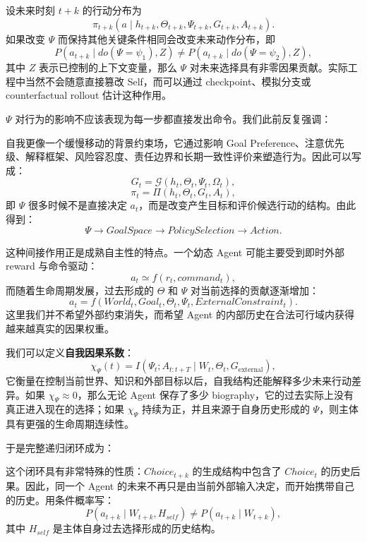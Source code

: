 设未来时刻 $t+k$ 的行动分布为
\[
\pi_{t+k}
\left(
a\mid
h_{t+k},
\Theta_{t+k},
\Psi_{t+k},
G_{t+k},
A_{t+k}
\right).
\]
如果改变 $\Psi$ 而保持其他关键条件相同会改变未来动作分布，即
\[
P(a_{t+k}\mid do(\Psi=\psi_1),Z)
\neq
P(a_{t+k}\mid do(\Psi=\psi_2),Z),
\]
其中 $Z$ 表示已控制的上下文变量，那么 $\Psi$ 对未来选择具有非零因果贡献。实际工程中当然不会随意直接篡改 Self，而可以通过 checkpoint、模拟分支或 counterfactual rollout 估计这种作用。

$\Psi$ 对行为的影响不应该表现为每一步都直接发出命令。我们此前反复强调：
\begin{statementbox}
\centering
{}
\end{statementbox}
自我更像一个缓慢移动的背景约束场，它通过影响 Goal Preference、注意优先级、解释框架、风险容忍度、责任边界和长期一致性评价来塑造行为。因此可以写成：
\[
G_t
=
\mathcal G(h_t,\Theta_t,\Psi_t,\Omega_t),
\]
\[
\pi_t
=
\Pi(h_t,\Theta_t,G_t,A_t),
\]
即 $\Psi$ 很多时候不是直接决定 $a_t$，而是改变产生目标和评价候选行动的结构。由此得到：
\[
\Psi
\rightarrow
GoalSpace
\rightarrow
PolicySelection
\rightarrow
Action.
\]

这种间接作用正是成熟自主性的特点。一个幼态 Agent 可能主要受到即时外部 reward 与命令驱动：
\[
a_t\simeq f(r_t,command_t),
\]
而随着生命周期发展，过去形成的 $\Theta$ 和 $\Psi$ 对当前选择的贡献逐渐增加：
\[
a_t
=
f(
World_t,
Goal_t,
\Theta_t,
\Psi_t,
ExternalConstraint_t
).
\]
这里我们并不希望外部约束消失，而希望 Agent 的内部历史在合法可行域内获得越来越真实的因果权重。

我们可以定义\textbf{自我因果系数}：
\[
\chi_\Psi(t)
=
I
\left(
\Psi_t;
A_{t:t+T}
\mid
W_t,\Theta_t,G_{\mathrm{external}}
\right),
\]
它衡量在控制当前世界、知识和外部目标以后，自我结构还能解释多少未来行动差异。如果 $\chi_\Psi\approx0$，那么无论 Agent 保存了多少 biography，它的过去实际上没有真正进入现在的选择；如果 $\chi_\Psi$ 持续为正，并且来源于自身历史形成的 $\Psi$，则主体具有更强的生命周期连续性。

于是完整递归闭环成为：
\begin{statementbox}
\centering
{}
\end{statementbox}
这个闭环具有非常特殊的性质：$Choice_{t+k}$ 的生成结构中包含了 $Choice_t$ 的历史后果。因此，同一个 Agent 的未来不再只是由当前外部输入决定，而开始携带自己的历史。用条件概率写：
\[
P(a_{t+k}\mid W_{t+k},H_{self})
\neq
P(a_{t+k}\mid W_{t+k}),
\]
其中 $H_{self}$ 是主体自身过去选择形成的历史结构。

